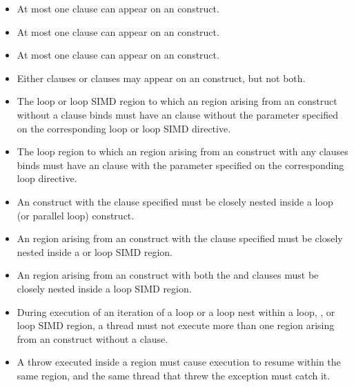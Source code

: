 \begin{itemize}
\item At most one  clause can appear on an  construct.

\item At most one  clause can appear on an  construct.

\item At most one  clause can appear on an  construct.

\item Either  clauses or 
clauses may appear on an  construct, but not both.

\item The loop or loop SIMD region to which an 
region arising from an  construct without a 
clause binds must have an  clause without the parameter
specified on the corresponding loop or loop SIMD directive.

\item The loop region to which an  region arising from an
 construct with any 
clauses binds must have an  clause with the parameter specified 
on the corresponding loop directive. 

\item An  construct with the  clause specified must
be closely nested inside a loop (or parallel loop) construct. 

\item An  region arising from an  construct with
the  clause specified must be closely nested inside a
 or loop SIMD region.

\item An  region arising from an  construct with
  both the  and  clauses must be closely nested inside
  a loop SIMD region.
  
\item During execution of an iteration of a loop or a loop nest within a loop, , or loop SIMD
region, a thread must not execute more than one  region arising
from an  construct without a  clause. 
\end{itemize}
\begin{cppspecific}
\begin{itemize}
\item A throw executed inside a  region must cause execution to 
resume within the same  region, and the same thread that threw 
the exception must catch it.
\end{itemize}
\end{cppspecific}



